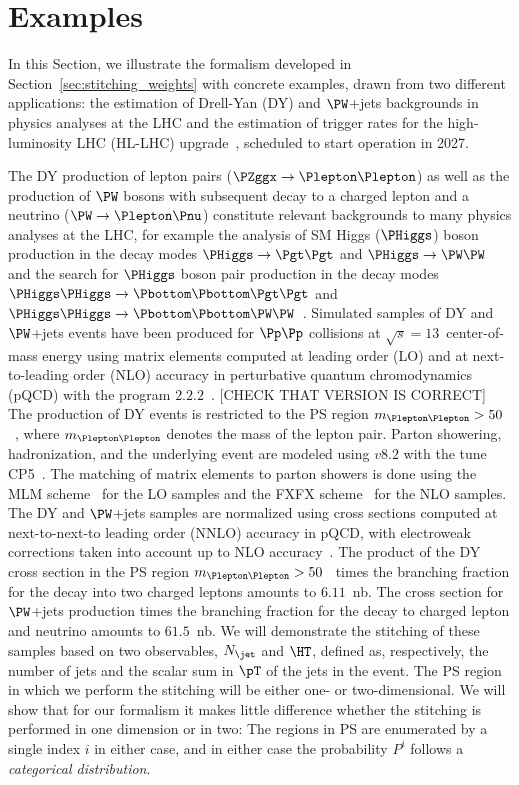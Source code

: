 \section{Examples}
\label{sec:examples}

In this Section, we illustrate the formalism developed in Section~\ref{sec:stitching_weights} with concrete examples,
drawn from two different applications: the estimation of Drell-Yan (DY) and $\PW$+jets backgrounds in physics analyses at the LHC
and the estimation of trigger rates for the high-luminosity LHC (HL-LHC) upgrade~\cite{TDR_Phase2_LHC},
scheduled to start operation in 2027.

The DY production of lepton pairs ($\PZggx \to \Plepton\Plepton$) as well as the production of $\PW$ bosons with subsequent decay to a charged lepton and a neutrino ($\PW \to \Plepton\Pnu$)
constitute relevant backgrounds to many physics analyses at the LHC,
for example the analysis of SM Higgs ($\PHiggs$) boson production in the decay modes $\PHiggs \to \Pgt\Pgt$ and $\PHiggs \to \PW\PW$
and the search for $\PHiggs$ boson pair production in the decay modes $\PHiggs\PHiggs \to \Pbottom\Pbottom\Pgt\Pgt$ and 
$\PHiggs\PHiggs \to \Pbottom\Pbottom\PW\PW$~\cite{ATLAS:2014aga,Aad:2015vsa,Aad:2019yxi,Aaboud:2018sfw,CMS-HIG-13-004,CMS-HIG-13-027,CMS-HIG-17-002,CMS-HIG-17-006}.
Simulated samples of DY and $\PW$+jets events have been produced for $\Pp\Pp$ collisions at $\sqrt{s}=13$~\TeV center-of-mass energy
using matrix elements computed at leading order (LO) and at next-to-leading order (NLO) accuracy in perturbative quantum chromodynamics (pQCD)
with the program \MGvATNLO $2.2.2$~\cite{Alwall:2014hca}. [CHECK THAT VERSION IS CORRECT]
The production of DY events is restricted to the PS region $m_{\Plepton\Plepton} > 50$~\GeV, where $m_{\Plepton\Plepton}$ denotes the mass of the lepton pair.
Parton showering, hadronization, and the underlying event are modeled using \PYTHIA $v8.2$ with the tune \textrm{CP5}~\cite{Sirunyan:2019dfx}.
The matching of matrix elements to parton showers is done using the \textrm{MLM} scheme~\cite{Alwall:2007fs} for the LO samples
and the \textrm{FXFX} scheme~\cite{Frederix:2012ps} for the NLO samples.
The DY and $\PW$+jets samples are normalized using cross sections computed at next-to-next-to leading order (NNLO) accuracy in pQCD,
with electroweak corrections taken into account up to NLO accuracy~\cite{Li:2012wna}.
The product of the DY cross section in the PS region $m_{\Plepton\Plepton} > 50$~\GeV
times the branching fraction for the decay into two charged leptons amounts to $6.11$~nb.
The cross section for $\PW$+jets production times the branching fraction for the decay to charged lepton and neutrino amounts to $61.5$~nb.
We will demonstrate the stitching of these samples based on two observables,
$N_{\jet}$ and $\HT$, defined as, respectively, the number of jets and the scalar sum in $\pT$ of the jets in the event.
The PS region in which we perform the stitching will be either one- or two-dimensional.
We will show that for our formalism
it makes little difference whether the stitching is performed in one dimension or in two:
The regions in PS are enumerated by a single index $i$ in either case,
and in either case the probability $P^{i}$ follows a {\em categorical distribution}.

